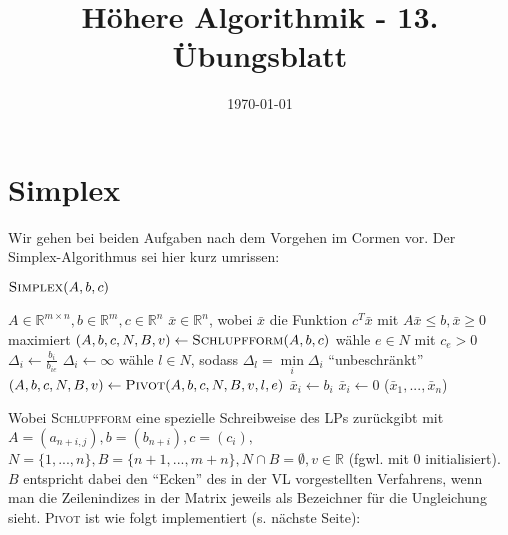 \documentclass[a4paper,10pt]{article}
\title{Höhere Algorithmik - 13. Übungsblatt}
\author{\Authors}
\date{\today}
\begin{document}
\maketitle

\section{Simplex}
Wir gehen bei beiden Aufgaben nach dem Vorgehen im Cormen \cite[S. 793ff]{cormen} vor. Der Simplex-Algorithmus sei hier kurz umrissen:
\begin{center}
\begin{minipage}{\textwidth}
    $\textsc{Simplex}(A, b, c)$
    \begin{algorithmic}[1]
        \REQUIRE $A \in \mathbb{R}^{m \times n}, b \in \mathbb{R}^{m}, c \in \mathbb{R}^{n}$
        \ENSURE $\bar x \in \mathbb{R}^{n}$, wobei $\bar x$ die Funktion $c^T \bar x$ mit $A\bar x \leq b, \bar x \geq 0$ maximiert
        \STATE $(A,b,c,N,B,v) \gets \textsc{Schlupfform}(A,b,c)$
            \STATE wähle $e \in N$ mit $c_e > 0$
                    \STATE $\Delta_i \gets \frac{b_i}{b_{ie}}$
                \ELSE
                    \STATE $\Delta_i \gets \infty$
                \ENDIF
            \ENDFOR
            \STATE wähle $l \in N$, sodass $\Delta_l = \min\limits_i \Delta_i$
                \RETURN "`unbeschränkt"'
            \ELSE
                \STATE $(A,b,c,N,B,v) \gets \textsc{Pivot}(A,b,c,N,B,v,l,e)$
            \ENDIF
        \ENDWHILE
                \STATE $\bar x_i \gets b_i$
            \ELSE
                \STATE $\bar x_i \gets 0$
            \ENDIF
        \ENDFOR
        \RETURN ($\bar x_1, ..., \bar x_n$)
    \end{algorithmic}
\end{minipage}
\end{center}
Wobei \textsc{Schlupfform} eine spezielle Schreibweise des LPs zurückgibt mit $A = (a_{n+i,j}), b = (b_{n+i}), c = (c_i), $
$N = \{1, ..., n\}, B = \{n+1, ..., m{+}n\}, N \cap B = \emptyset, v \in \mathbb{R}$ (fgwl. mit 0 initialisiert). $B$ entspricht dabei den "`Ecken"' des in der VL vorgestellten Verfahrens, wenn man die Zeilenindizes in der Matrix jeweils als Bezeichner für die Ungleichung sieht. \textsc{Pivot} ist wie folgt implementiert (s. nächste Seite):
\end{document}
